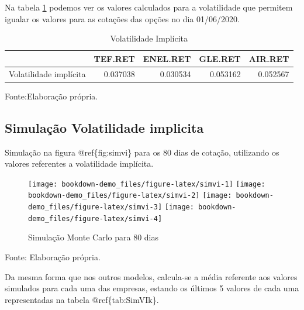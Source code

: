 \documentclass[
  12pt,
  a4paper,
  openany]{book}
\theoremstyle{definition}
\theoremstyle{definition}
\theoremstyle{definition}
\theoremstyle{remark}
\begin{document}
\normalsize

Na tabela \ref{tab:tablevi} podemos ver os valores calculados para a volatilidade que permitem igualar os valores para as cotações das opções no dia 01/06/2020.

\begin{table}[!h]

\caption{\label{tab:tablevi}Volatilidade Implícita}
\centering
\begin{tabular}[t]{lrrrr}
\toprule
  & TEF.RET & ENEL.RET & GLE.RET & AIR.RET\\
\midrule
Volatilidade implícita & 0.037038 & 0.030534 & 0.053162 & 0.052567\\
\bottomrule
\end{tabular}
\end{table}
\FloatBarrier
\centering

Fonte:Elaboração própria.

\justifying
\bigskip

\hypertarget{simulauxe7uxe3o-volatilidade-implicita}{%
\subsection{Simulação Volatilidade implicita}\label{simulauxe7uxe3o-volatilidade-implicita}}

Simulação na figura @ref\{fig:simvi\} para os 80 dias de cotação, utilizando os valores referentes a volatilidade implícita.

\begin{figure}

{\centering \texttt{[image: bookdown-demo\_files/figure-latex/simvi-1]} \texttt{[image: bookdown-demo\_files/figure-latex/simvi-2]} \texttt{[image: bookdown-demo\_files/figure-latex/simvi-3]} \texttt{[image: bookdown-demo\_files/figure-latex/simvi-4]} 

}

\caption{Simulação Monte Carlo para 80 dias}\label{fig:simvi}
\end{figure}
\FloatBarrier
\centering

Fonte: Elaboração própria.

\justifying
\bigskip

Da mesma forma que nos outros modelos, calcula-se a média referente aos valores simulados para cada uma das empresas, estando os últimos 5 valores de cada uma representadas na tabela @ref\{tab:SimVIk\}.
\end{document}
